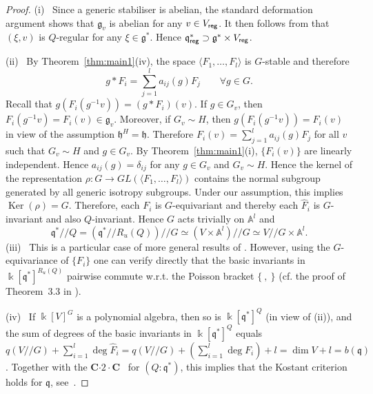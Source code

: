 \begin{proof}
(i) \ Since a generic stabiliser is abelian, the standard deformation argument shows that ${{\mathfrak g}}_v$ is 
abelian for any $v\in V_{\sf reg}$. It then follows from \cite[Prop.\,5.5]{p05} that $(\xi,v)$
is $Q$-regular for any $\xi\in{{\mathfrak g}}^*$. Hence  ${{\mathfrak q}}^*_{\sf reg}\supset {{\mathfrak g}}^*\times V_{\sf reg}$.

(ii) \ By Theorem~\ref{thm:main1}(iv), the space $\langle F_1,\dots, F_l\rangle$ is $G$-stable 
and therefore
\[
    g\ast F_i =\sum_{j=1}^l a_{ij}(g) F_j   \qquad \forall g\in G .
\]
Recall that $g(F_i(g^{-1}v))=(g\ast F_i)(v)$. 
If  $g\in G_v$, then $F_i(g^{-1}v)=F_i(v)\in {{\mathfrak g}}_v$. Moreover, if $G_v\sim H$, then
$g(F_i(g^{-1}v))=F_i(v)$ in view of the assumption ${{\mathfrak h}}^H={{\mathfrak h}}$. Therefore
$F_i(v)=\sum_{j=1}^l a_{ij}(g) F_j$ for all $v$ such that $G_v\sim H$ and $g\in G_v$.
By Theorem~\ref{thm:main1}(i),  $\{F_i(v)\}$ are linearly independent. Hence
$a_{ij}(g)=\delta_{ij}$ for any $g\in G_v$ and $G_v\sim H$. Hence the kernel of the representation 
$\rho: G\to GL(\langle F_1,\dots, F_l\rangle)$ contains the normal subgroup generated by all
generic isotropy subgroups. Under our assumption, this implies ${\operatorname{Ker}}(\rho)=G$. Therefore, each
$F_i$ is $G$-equivariant and thereby each $\hat F_i$ is $G$-invariant and also $Q$-invariant.
Hence $G$ acts trivially on $\mathbb A^l$ and 
\[
   {{\mathfrak q}}^*{/\!\!/} Q =({{\mathfrak q}}^*{/\!\!/} {R_u(Q)}){/\!\!/} G \simeq (V\times \mathbb A^l){/\!\!/} G\simeq
   V{/\!\!/} G \times \mathbb A^l .
\]
\indent (iii) \ This is a particular case of more general results of \cite{Y16}. However, using the $G$-equivariance of  $\{F_i\}$ one can verify directly that the basic invariants in ${\Bbbk}[{{\mathfrak q}}^*]^{R_u(Q)}$ pairwise commute w.r.t. the Poisson bracket $\{\ ,\ \}$
(cf. the proof of Theorem~3.3 in \cite{BSM14}).

(iv) \ If  ${\Bbbk}[V]^G$ is a polynomial algebra, then so is ${\Bbbk}[{{\mathfrak q}}^*]^Q$ (in view of (ii)), and the sum of degrees of 
the basic invariants in ${\Bbbk}[{{\mathfrak q}}^*]^Q$ equals 
$q(V{/\!\!/} G)+\sum_{i=1}^l \deg\hat F_i=q(V{/\!\!/} G)+(\sum_{i=1}^l \deg F_i)+l=\dim V+l=b({{\mathfrak q}})$. 
Together with the {\textsf{\bfseries C${\cdot}2{\cdot}$C}\ } for $(Q:{{\mathfrak q}}^*)$, this implies that the Kostant criterion holds for ${{\mathfrak q}}$,
see~\cite[Theorem\,1.2]{coadj}. 
\end{proof}

